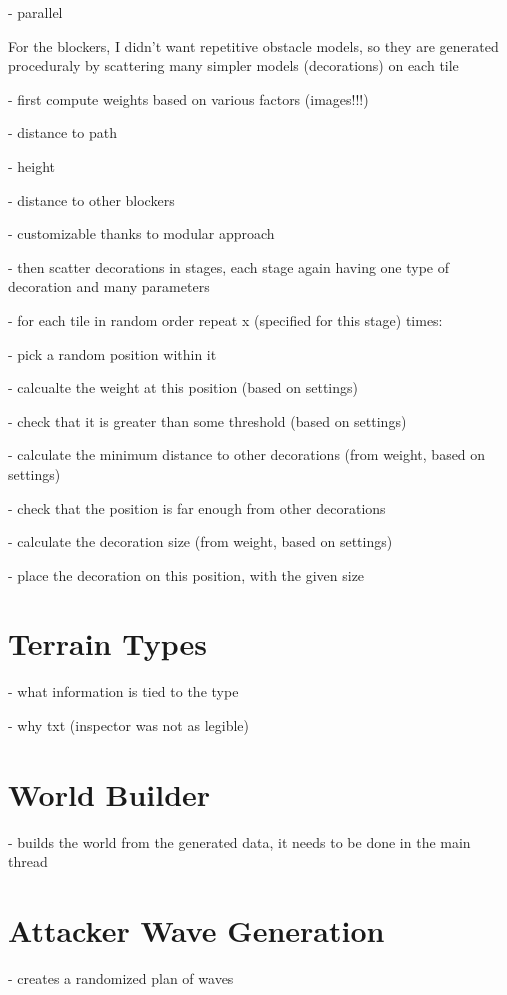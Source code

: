 - parallel

For the blockers, I didn't want repetitive obstacle models, so they are generated proceduraly by scattering many simpler models (decorations) on each tile

- first compute weights based on various factors (images!!!)

- distance to path

- height

- distance to other blockers

- customizable thanks to modular approach

- then scatter decorations in stages, each stage again having one type of decoration and many parameters

- for each tile in random order repeat x (specified for this stage) times:

- pick a random position within it

- calcualte the weight at this position (based on settings)

- check that it is greater than some threshold (based on settings)

- calculate the minimum distance to other decorations (from weight, based on settings)

- check that the position is far enough from other decorations

- calculate the decoration size (from weight, based on settings)

- place the decoration on this position, with the given size

\section{Terrain Types}

- what information is tied to the type

- why txt (inspector was not as legible)

\section{World Builder}

- builds the world from the generated data, it needs to be done in the main thread

\section{Attacker Wave Generation}

- creates a randomized plan of waves

